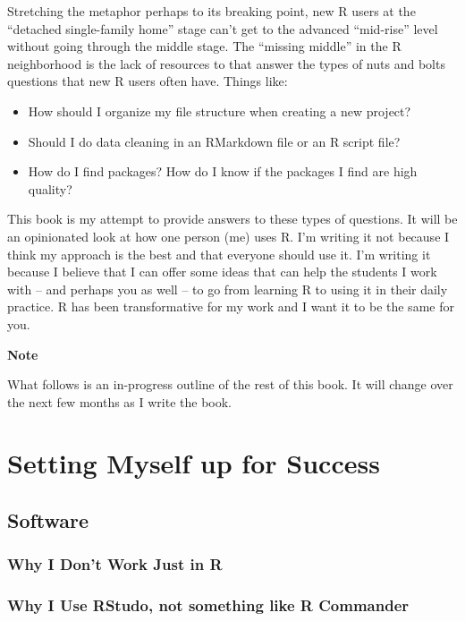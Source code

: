 \documentclass[]{book}
\providecommand{\tightlist}{%
  \setlength{\itemsep}{0pt}\setlength{\parskip}{0pt}}
\begin{document}
Stretching the metaphor perhaps to its breaking point, new R users at the ``detached single-family home'' stage can't get to the advanced ``mid-rise'' level without going through the middle stage. The ``missing middle'' in the R neighborhood is the lack of resources to that answer the types of nuts and bolts questions that new R users often have. Things like:

\begin{itemize}
\tightlist
\item
  How should I organize my file structure when creating a new project?
\item
  Should I do data cleaning in an RMarkdown file or an R script file?
\item
  How do I find packages? How do I know if the packages I find are high quality?
\end{itemize}

This book is my attempt to provide answers to these types of questions. It will be an opinionated look at how one person (me) uses R. I'm writing it not because I think my approach is the best and that everyone should use it. I'm writing it because I believe that I can offer some ideas that can help the students I work with -- and perhaps you as well -- to go from learning R to using it in their daily practice. R has been transformative for my work and I want it to be the same for you.

\textbf{Note}

What follows is an in-progress outline of the rest of this book. It will change over the next few months as I write the book.

\hypertarget{setting-myself-up-for-success}{%
\chapter{Setting Myself up for Success}\label{setting-myself-up-for-success}}

\hypertarget{software}{%
\section{Software}\label{software}}

\hypertarget{why-i-dont-work-just-in-r}{%
\subsection{Why I Don't Work Just in R}\label{why-i-dont-work-just-in-r}}

\hypertarget{why-i-use-rstudo-not-something-like-r-commander}{%
\subsection{Why I Use RStudo, not something like R Commander}\label{why-i-use-rstudo-not-something-like-r-commander}}
\end{document}

